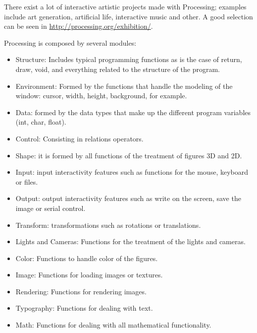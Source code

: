 There exist a lot of interactive artistic projects made with Processing; examples include art generation, artificial life, interactive music and other. A good selection can be seen in \url{http://processing.org/exhibition/}.

Processing is composed by several modules:

\begin{itemize}
\item Structure: Includes typical programming functions as is the case of return, draw, void, and everything related to the structure of the program.
\item Environment: Formed by the functions that handle the modeling of the window: cursor, width, height, background, for example.
\item Data: formed by the data types that make up the different program variables (int, char, float).
\item Control: Consisting in relations operators.
\item Shape: it is formed by all functions of the treatment of figures 3D and 2D.
\item Input: input interactivity features such as functions for the mouse, keyboard or files.
\item Output: output interactivity features such as write on the screen, save the image or serial control.
\item Transform: transformations such as rotations or translations.
\item Lights and Cameras: Functions for the treatment of the lights and cameras.
\item Color: Functions to handle color of the figures.
\item Image: Functions for loading images or textures.
\item Rendering: Functions for rendering images.
\item Typography: Functions for dealing with text.
\item Math: Functions for dealing with all mathematical functionality.
\end{itemize}

